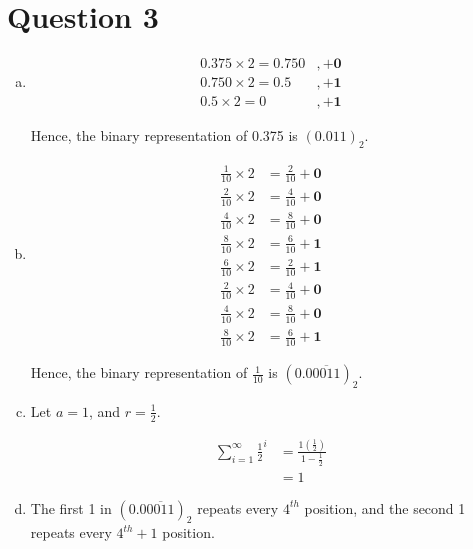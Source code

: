 \documentclass[12pt]{article}
\begin{document}
\section*{Question 3}
\begin{enumerate}[a.]
    \item

    \begin{align*}
        0.375 \times 2 = 0.750 &, + \textbf{0}\\
        0.750 \times 2 = 0.5 &, + \textbf{1}\\
        0.5 \times 2 = 0 &, + \textbf{1}
    \end{align*}

    Hence, the binary representation of 0.375 is $(0.011)_2$.

    \item

    \begin{align*}
        \frac{1}{10} \times 2 &= \frac{2}{10} + \textbf{0}\\
        \frac{2}{10} \times 2 &= \frac{4}{10} + \textbf{0}\\
        \frac{4}{10} \times 2 &= \frac{8}{10} + \textbf{0}\\
        \frac{8}{10} \times 2 &= \frac{6}{10} + \textbf{1}\\
        \frac{6}{10} \times 2 &= \frac{2}{10} + \textbf{1}\\
        \frac{2}{10} \times 2 &= \frac{4}{10} + \textbf{0}\\
        \frac{4}{10} \times 2 &= \frac{8}{10} + \textbf{0}\\
        \frac{8}{10} \times 2 &= \frac{6}{10} + \textbf{1}
    \end{align*}

    Hence, the binary representation of $\frac{1}{10}$ is $(0.0\overline{0011})_2$.

    \item

    Let $a = 1$, and $r = \frac{1}{2}$.

    \bigskip
    \setcounter{equation}{0}
    \begin{align}
        \sum\limits_{i=1}^{\infty} \frac{1}{2}^i &= \frac{1(\frac{1}{2})}{1 - \frac{1}{2}}\\
        &= 1
    \end{align}

    \item

    The first 1 in $(0.0\overline{0011})_2$ repeats every $4^{th}$ position, and
    the second 1 repeats every $4^{th} + 1$ position.


\end{enumerate}
\end{document}
